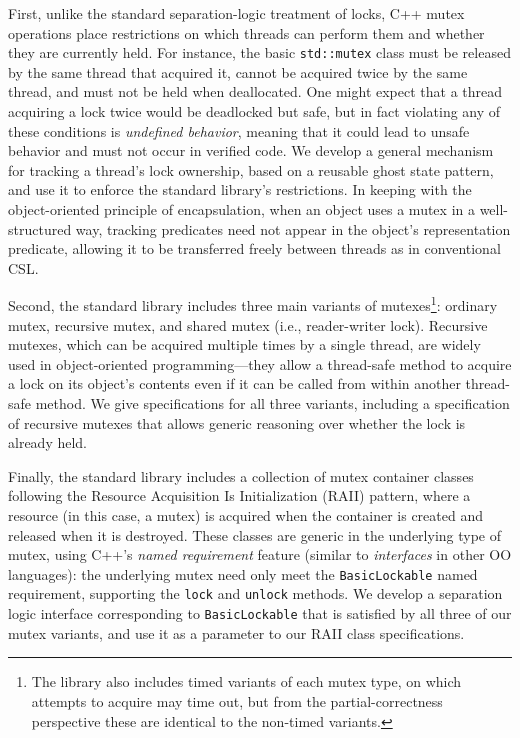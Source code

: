\documentclass[acmsmall,screen,review,anonymous]{acmart}
\begin{document}
First, unlike the standard separation-logic treatment of locks, C++ mutex operations place restrictions on which threads can perform them and whether they are currently held. For instance, the basic \lstinline{std::mutex} class must be released by the same thread that acquired it, cannot be acquired twice by the same thread, and must not be held when deallocated. One might expect that a thread acquiring a lock twice would be deadlocked but safe, but in fact violating any of these conditions is \emph{undefined behavior}, meaning that it could lead to unsafe behavior and must not occur in verified code. We develop a general mechanism for tracking a thread's lock ownership, based on a reusable ghost state pattern, and use it to enforce the standard library's restrictions. In keeping with the object-oriented principle of encapsulation, when an object uses a mutex in a well-structured way, tracking predicates need not appear in the object's representation predicate, allowing it to be transferred freely between threads as in conventional CSL.

Second, the standard library includes three main variants of mutexes\footnote{The library also includes timed variants of each mutex type, on which attempts to acquire may time out, but from the partial-correctness perspective these are identical to the non-timed variants.}: ordinary mutex, recursive mutex, and shared mutex (i.e., reader-writer lock). Recursive mutexes, which can be acquired multiple times by a single thread, are widely used in object-oriented programming---they allow a thread-safe method to acquire a lock on its object's contents even if it can be called from within another thread-safe method. We give specifications for all three variants, including a specification of recursive mutexes that allows generic reasoning over whether the lock is already held.

Finally, the standard library includes a collection of mutex container classes following the Resource Acquisition Is Initialization (RAII) pattern, where a resource (in this case, a mutex) is acquired when the container is created and released when it is destroyed. These classes are generic in the underlying type of mutex, using C++'s \emph{named requirement} feature (similar to \emph{interfaces} in other OO languages): the underlying mutex need only meet the \lstinline{BasicLockable} named requirement, supporting the \lstinline{lock} and \lstinline{unlock} methods. We develop a separation logic interface corresponding to \lstinline{BasicLockable} that is satisfied by all three of our mutex variants, and use it as a parameter to our RAII class specifications.
\end{document}
